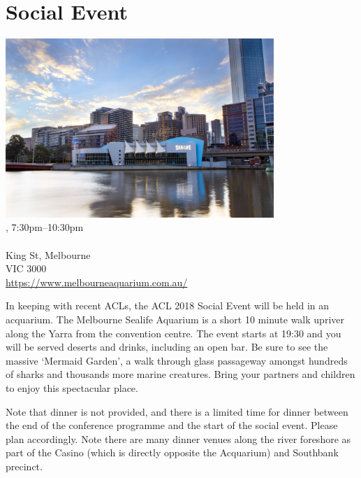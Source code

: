 \clearpage
\section{Social Event}
\setheaders{}{\daydateyear}

\begin{center}

\includegraphics[width=4in]{content/day2/aquarium.jpg} \\


\daydateyear, 7:30pm--10:30pm \vspace{1em}\\
\SocialLoc\\
King St, Melbourne \\
VIC 3000 \\
\url{https://www.melbourneaquarium.com.au/}
\end{center}

In keeping with recent ACLs, the ACL 2018 Social Event will be held in an
acquarium.  The Melbourne Sealife Aquarium is a short 10 minute walk upriver
along the Yarra from the convention centre. The event starts at 19:30 and you
will be served deserts and drinks, including an open bar.  Be sure to see the
massive `Mermaid Garden', a walk through glass passageway amongst hundreds of
sharks and thousands more marine creatures. Bring your partners and children 
to enjoy this spectacular place.

Note that dinner is not provided, and there is a limited time for dinner
between the end of the conference programme and the start of the social event.
Please plan accordingly.  Note there are many dinner venues along the river
foreshore as part of the Casino (which is directly opposite the Acquarium) and
Southbank precinct.
